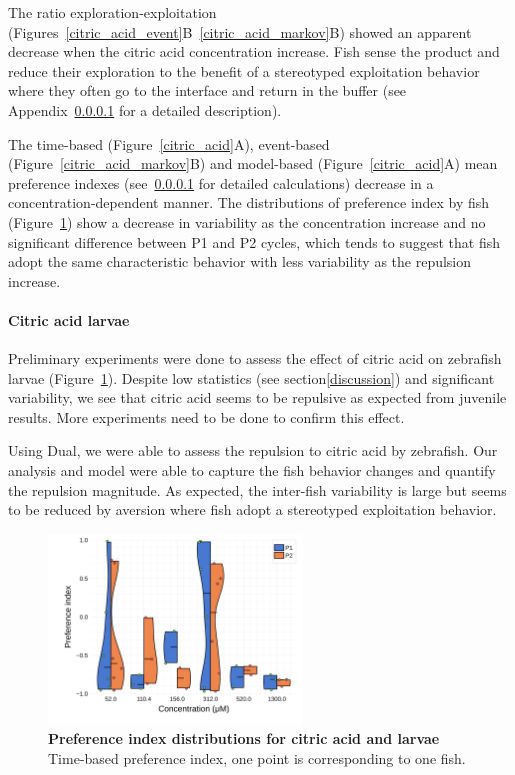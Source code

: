   The ratio exploration-exploitation (Figures~\ref{citric_acid_event}B~\ref{citric_acid_markov}B) showed an apparent decrease when the citric acid concentration increase. Fish sense the product and reduce their exploration to the benefit of a stereotyped exploitation behavior where they often go to the interface and return in the buffer (see Appendix~\ref{} for a detailed description).

  The time-based (Figure~\ref{citric_acid}A), event-based (Figure~\ref{citric_acid_markov}B) and model-based (Figure~\ref{citric_acid}A) mean preference indexes (see~\ref{} for detailed calculations) decrease in a concentration-dependent manner. The distributions of preference index by fish (Figure~\ref{dist_citric_acid}) show a decrease in variability as the concentration increase and no significant difference between P1 and P2 cycles, which tends to suggest that fish adopt the same characteristic behavior with less variability as the repulsion increase.


  \paragraph{Citric acid larvae} Preliminary experiments were done to assess the effect of citric acid on zebrafish larvae (Figure~\ref{dist_citric_acid}). Despite low statistics (see section\ref{discussion}) and significant variability, we see that citric acid seems to be repulsive as expected from juvenile results. More experiments need to be done to confirm this effect.

  Using Dual, we were able to assess the repulsion to citric acid by zebrafish. Our analysis and model were able to capture the fish behavior changes and quantify the repulsion magnitude. As expected, the inter-fish variability is large but seems to be reduced by aversion where fish adopt a stereotyped exploitation behavior.

    \begin{figure}[h]
      \centering
      \includegraphics[width=0.6\textwidth]{part_2/assets/dist_citricacid_lar.png}
      \caption{\textbf{Preference index distributions for citric acid and larvae} Time-based preference index, one point is corresponding to one fish.}
      \label{dist_citric_acid}
    \end{figure}

